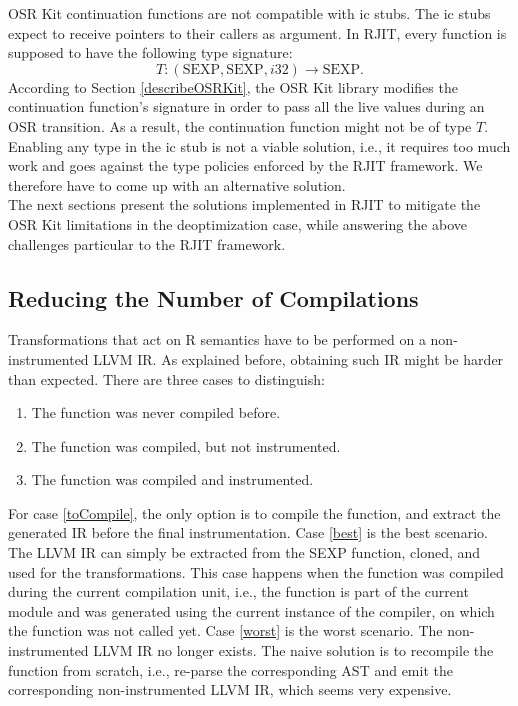 OSR Kit continuation functions are not compatible with ic stubs.
The ic stubs expect to receive pointers to their callers as argument.
In RJIT, every function is supposed to have the following type signature:
$$T: (\text{SEXP}, \text{SEXP}, i32) \rightarrow \text{SEXP}.$$
According to Section \ref{describeOSRKit}, the OSR Kit\cite{OSRKit} library modifies the continuation function's signature in order to pass all the live values during an OSR transition.
As a result, the continuation function might not be of type $T$.
Enabling any type in the ic stub is not a viable solution, i.e., it requires too much work and goes against the type policies enforced by the RJIT framework. 
We therefore have to come up with an alternative solution.\\

The next sections present the solutions implemented in RJIT to mitigate the OSR Kit limitations in the deoptimization case, while answering the above challenges particular to the RJIT framework.\\

\subsection{Reducing the Number of Compilations}\label{section:reducecompilations}

Transformations that act on R semantics have to be performed on a non-instrumented LLVM IR.
As explained before, obtaining such IR might be harder than expected. 
There are three cases to distinguish:
\begin{enumerate}
    \item The function was never compiled before.\label{toCompile}
    \item The function was compiled, but not instrumented.\label{best} 
    \item The function was compiled and instrumented.\label{worst}
\end{enumerate}

For case \ref{toCompile}, the only option is to compile the function, and extract the generated IR before the final instrumentation.
Case \ref{best} is the best scenario.
The LLVM IR can simply be extracted from the SEXP function, cloned, and used for the transformations.
This case happens when the function was compiled during the current compilation unit, i.e., the function is part of the current module and was generated using the current instance of the compiler, on which the  function was not called yet.
Case \ref{worst} is the worst scenario.
The non-instrumented LLVM IR no longer exists.
The naive solution is to recompile the function from scratch, i.e., re-parse the corresponding AST and emit the corresponding non-instrumented LLVM IR, which seems very expensive.\\

